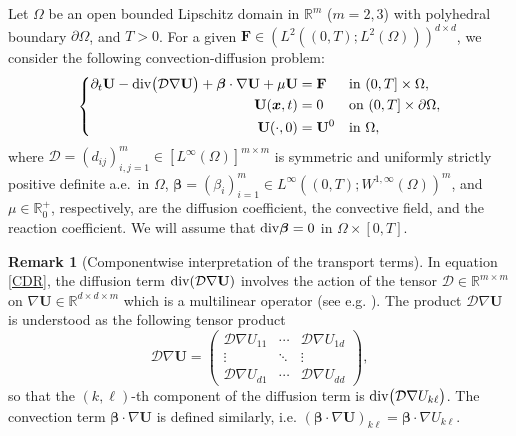\documentclass[final,12pt]{amsart}
\theoremstyle{plain}
\theoremstyle{definition}
\newtheorem{Remark}[theorem]{Remark}
\newcommand\bx{\boldsymbol{x}}
\newcommand\bbeta{{\boldsymbol{\beta}}}
\begin{document}
Let $\Omega$ be an open bounded Lipschitz domain in $\mathbb{R}^{m}$ ($m=2,3$) with polyhedral boundary $\partial \Omega$, and $T>0$.
For a given $\mathbf{F}\in (L^{2}((0,T);L^{2}(\Omega)))^{d\times d}$, we consider the following convection-diffusion problem:
\begin{equation}
	\begin{split}
		\left\{
		\begin{aligned}
			\partial_{t}\mathbf{U} - {\rm div}\big(\mathcal{D}  \nabla \mathbf{U}\big) + \bbeta \cdot \nabla \mathbf{U} + \mu \mathbf{U} &= \mathbf{F}  &&\text{in } (0,T] \times \Omega, \\
			\mathbf{U}(\bx, t) &= 0  &&\text{on } (0,T] \times \partial \Omega, \\
			\mathbf{U}(\cdot, 0) &= \mathbf{U}^{0} &&\text{in } \Omega,
		\end{aligned}
		\right.\label{CDR}
	\end{split}
\end{equation}
where $\mathcal{D}=(d_{ij})_{i,j=1}^{m}\in [L^{\infty}(\Omega)]^{m\times m}$ is symmetric and uniformly strictly positive definite a.e.~in $\Omega$, $\bbeta=( \beta_{i})_{i=1}^{m}\in L^{\infty}((0,T);W^{1,\infty}(\Omega))^{m}$,  and $\mu\in \mathbb{R}^{+}_{0}$, respectively, are the diffusion coefficient, the convective field, and the reaction coefficient. 
We will assume that $ {\rm div} \bbeta=0$ in $\Omega\times[0,T]$.

\begin{Remark}[Componentwise interpretation of the transport terms]
	In equation \eqref{CDR}, the diffusion term ${\rm div}(\mathcal{D}  \nabla \mathbf{U})$ involves the action of the tensor $\mathcal{D} \in \mathbb{R}^{m \times m}$ on $\nabla \mathbf{U} \in \mathbb{R}^{d \times d\times m}$  which is a multilinear operator (see e.g. \cite{amiri2021approximation}). The product $\mathcal{D}  \nabla \mathbf{U}$ is understood as the following tensor product 
	\begin{equation}
		\mathcal{D} \nabla \mathbf{U}   =  \begin{pmatrix}
		\mathcal{D}\nabla U_{11} & \cdots & \mathcal{D}\nabla U_{1d} \\
		\vdots & \ddots & \vdots \\
		\mathcal{D}\nabla U_{d1} & \cdots & \mathcal{D}\nabla U_{dd}
	\end{pmatrix},
	\end{equation}
	so that the $(k,\ell)$-th component of the diffusion term is ${\rm div}\big( \mathcal{D}\nabla U_{k\ell}\big)$. The convection term $\bbeta \cdot \nabla \mathbf{U} $ is defined similarly, i.e. $(\bbeta\cdot\nabla \mathbf{U})_{k\ell}=\bbeta\cdot\nabla U_{k\ell}$.
\end{Remark}
\end{document}
